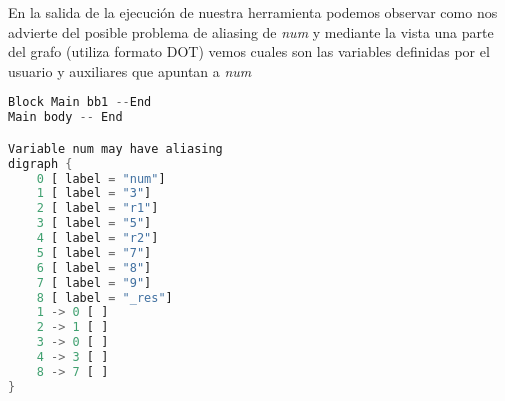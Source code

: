 En la salida de la ejecución de nuestra herramienta podemos observar como nos advierte del posible problema de aliasing de \textit{num} y mediante la vista una parte del grafo (utiliza formato DOT) vemos cuales son las variables definidas por el usuario y auxiliares que apuntan a \textit{num}

\begin{minipage}[c][10cm][c]{0,5\textwidth}
\begin{lstlisting}[language=Rust]
Block Main bb1 --End
Main body -- End

Variable num may have aliasing
digraph {
    0 [ label = "num"]
    1 [ label = "3"]
    2 [ label = "r1"]
    3 [ label = "5"]
    4 [ label = "r2"]
    5 [ label = "7"]
    6 [ label = "8"]
    7 [ label = "9"]
    8 [ label = "_res"]
    1 -> 0 [ ]
    2 -> 1 [ ]
    3 -> 0 [ ]
    4 -> 3 [ ]
    8 -> 7 [ ]
}
\end{lstlisting}
\end{minipage}
\begin{minipage}[c][9cm][t]{0,5\textwidth}
\begin{center}
\end{center}
\end{minipage}
